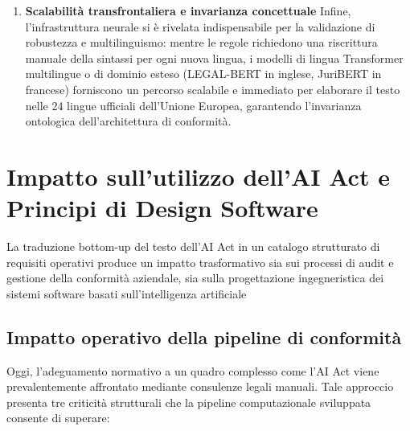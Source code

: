 \documentclass[12pt,a4paper,oneside]{report}
\begin{document}
\begin{enumerate}
\item \textbf{Scalabilità transfrontaliera e invarianza concettuale}
Infine, l'infrastruttura neurale si è rivelata indispensabile per la validazione di robustezza e multilinguismo: mentre le regole richiedono una riscrittura manuale della sintassi per ogni nuova lingua, i modelli di lingua Transformer multilingue o di dominio esteso (LEGAL-BERT in inglese, JuriBERT in francese) forniscono un percorso scalabile e immediato per elaborare il testo nelle 24 lingue ufficiali dell'Unione Europea, garantendo l'invarianza ontologica dell'architettura di conformità.
\end{enumerate}


\section{Impatto sull'utilizzo dell'AI Act e Principi di Design Software}
La traduzione bottom-up del testo dell'AI Act in un catalogo strutturato di requisiti operativi produce un impatto trasformativo sia sui processi di audit e gestione della conformità aziendale, sia sulla progettazione ingegneristica dei sistemi software basati sull'intelligenza artificiale

\subsection{Impatto operativo della pipeline di conformità}
\label{sec:impatto_operativo_pipeline}


Oggi, l'adeguamento normativo a un quadro complesso come l'AI Act viene prevalentemente affrontato mediante consulenze legali manuali. Tale approccio presenta tre criticità strutturali che la pipeline computazionale sviluppata consente di superare:
\end{document}
